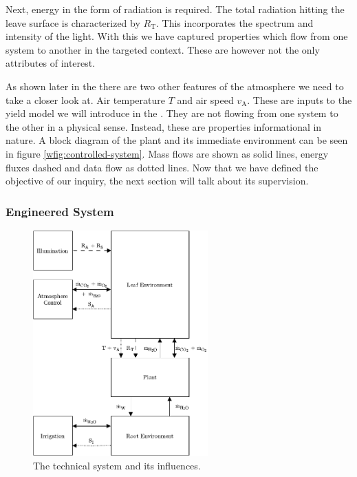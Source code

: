 Next, energy in the form of radiation is required.
The total radiation hitting the leave surface is characterized by $R_\text{T}$.
This incorporates the spectrum and intensity of the light.
With this we have captured properties which flow from one system to another in the targeted context.
These are however not the only attributes of interest.

As shown later in the  there are two other features of the atmosphere we need to take a closer look at.
Air temperature $T$ and air speed $v_\text{A}$.
These are inputs to the yield model we will introduce in the .
They are not flowing from one system to the other in a physical sense. %
Instead, these are properties informational in nature.
A block diagram of the plant and its immediate environment can be seen in figure \ref{wfig:controlled-system}.
Mass flows are shown as solid lines, energy fluxes dashed and data flow as dotted lines.
Now that we have defined the objective of our inquiry, the next section will talk about its supervision.


\subsubsection{Engineered System}
\label{subsub:engineered-system}
\begin{figure}
	\caption{The technical system and its influences.}
	\label{wfig:engineered-system}
	\includegraphics[width=0.6\textwidth]{img/engineered-system.pdf}
\end{figure} 

